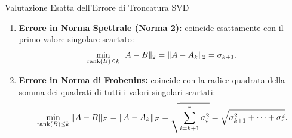 \begin{alertblock}{Valutazione Esatta dell'Errore di Troncatura SVD}
\begin{enumerate}
    \item \textbf{Errore in Norma Spettrale (Norma 2):} coincide esattamente con il primo valore singolare scartato:
    \begin{equation}
        \min_{\operatorname{rank}(B) \le k} \|A - B\|_2 = \|A - A_k\|_2 = \sigma_{k+1}.
    \end{equation}
    \item \textbf{Errore in Norma di Frobenius:} coincide con la radice quadrata della somma dei quadrati di tutti i valori singolari scartati:
    \begin{equation}
        \min_{\operatorname{rank}(B) \le k} \|A - B\|_F = \|A - A_k\|_F = \sqrt{\sum_{i=k+1}^r \sigma_i^2} = \sqrt{\sigma_{k+1}^2 + \dots + \sigma_r^2}.
    \end{equation}
\end{enumerate}
\end{alertblock}

